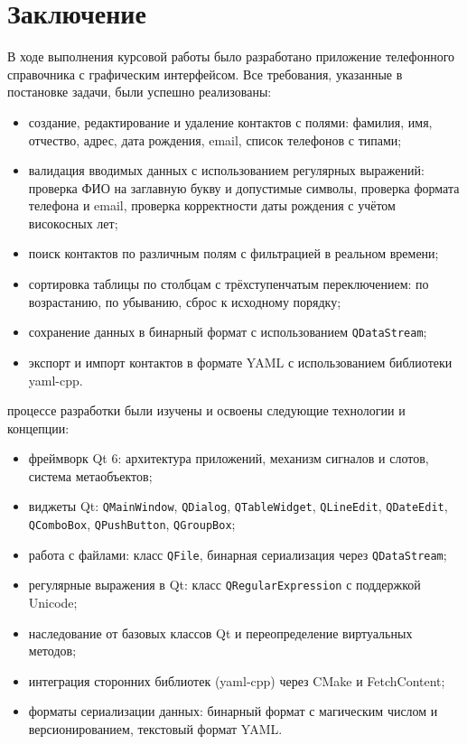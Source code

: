 \section{Заключение}

В ходе выполнения курсовой работы было разработано приложение телефонного справочника с графическим интерфейсом. Все требования, указанные в постановке задачи, были успешно реализованы:

\begin{itemize}
    \item создание, редактирование и удаление контактов с полями: фамилия, имя, отчество, адрес, дата рождения, email, список телефонов с типами;
    \item валидация вводимых данных с использованием регулярных выражений: проверка ФИО на заглавную букву и допустимые символы, проверка формата телефона и email, проверка корректности даты рождения с учётом високосных лет;
    \item поиск контактов по различным полям с фильтрацией в реальном времени;
    \item сортировка таблицы по столбцам с трёхступенчатым переключением: по возрастанию, по убыванию, сброс к исходному порядку;
    \item сохранение данных в бинарный формат с использованием \texttt{QDataStream};
    \item экспорт и импорт контактов в формате YAML с использованием библиотеки yaml-cpp.
\end{itemize}

 процессе разработки были изучены и освоены следующие технологии и концепции:

\begin{itemize}
    \item фреймворк Qt 6: архитектура приложений, механизм сигналов и слотов, система метаобъектов;
    \item виджеты Qt: \texttt{QMainWindow}, \texttt{QDialog}, \texttt{QTableWidget}, \texttt{QLineEdit}, \texttt{QDateEdit}, \texttt{QComboBox}, \texttt{QPushButton}, \texttt{QGroupBox};
    \item работа с файлами: класс \texttt{QFile}, бинарная сериализация через \texttt{QDataStream};
    \item регулярные выражения в Qt: класс \texttt{QRegularExpression} с поддержкой Unicode;
    \item наследование от базовых классов Qt и переопределение виртуальных методов;
    \item интеграция сторонних библиотек (yaml-cpp) через CMake и FetchContent;
    \item форматы сериализации данных: бинарный формат с магическим числом и версионированием, текстовый формат YAML.
\end{itemize}

